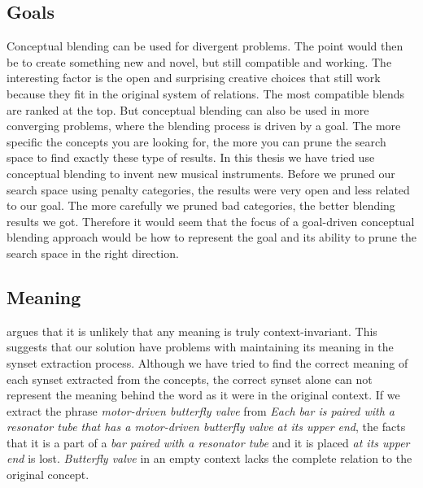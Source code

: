 
\subsection{Goals}
Conceptual blending can be used for divergent problems. The point would then be to create something new and novel, but still compatible and working. The interesting factor is the open and surprising creative choices that still work because they fit in the original system of relations. The most compatible blends are ranked at the top. But conceptual blending can also be used in more converging problems, where the blending process is driven by a goal. The more specific the concepts you are looking for, the more you can prune the search space to find exactly these type of results. In this thesis we have tried use conceptual blending to invent new musical instruments. Before we pruned our search space using penalty categories, the results were very open and less related to our goal. The more carefully we pruned bad categories, the better blending results we got. Therefore it would seem that the focus of a goal-driven conceptual blending approach would be how to represent the goal and its ability to prune the search space in the right direction.


\subsection{Meaning}
\parencite{Reference5} argues that it is unlikely that any meaning is truly context-invariant. This suggests that our solution have problems with maintaining its meaning in the synset extraction process. Although we have tried to find the correct meaning of each synset extracted from the concepts, the correct synset alone can not represent the meaning behind the word as it were in the original context. If we extract the phrase \emph{motor-driven butterfly valve} from \emph{Each bar is paired with a resonator tube that has a motor-driven butterfly valve at its upper end}, the facts that it is a part of a \emph{bar paired with a resonator tube} and it is placed \emph{at its upper end} is lost. \emph{Butterfly valve} in an empty context lacks the complete relation to the original concept.


